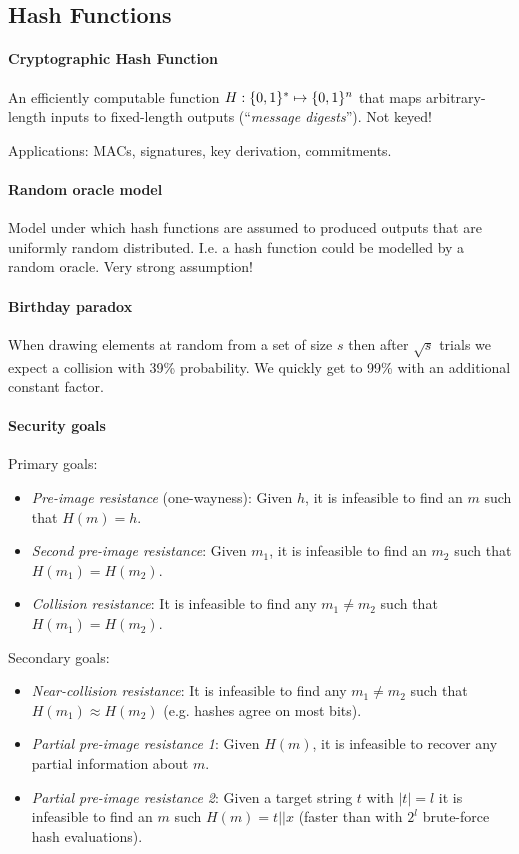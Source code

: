 \subsection{Hash Functions}

\paragraph{Cryptographic Hash Function}
An efficiently computable function $H: \lbrace 0, 1 \rbrace^* \mapsto \lbrace 0, 1 \rbrace^n$ that maps arbitrary-length inputs to fixed-length outputs (``\emph{message digests}'').
Not keyed!

Applications: MACs, signatures, key derivation, commitments.

\paragraph{Random oracle model}
Model under which hash functions are assumed to produced outputs that are uniformly random distributed.
I.e. a hash function could be modelled by a random oracle.
Very strong assumption!

\paragraph{Birthday paradox}
When drawing elements at random from a set of size $s$ then after $\sqrt{s}$ trials we expect a collision with 39\% probability.
We quickly get to 99\% with an additional constant factor.

\paragraph{Security goals}
Primary goals:
\begin{itemize}
	\item \emph{Pre-image resistance} (one-wayness):
	Given $h$, it is infeasible to find an $m$ such that $H(m) = h$.
	\item \emph{Second pre-image resistance}:
	Given $m_1$, it is infeasible to find an $m_2$ such that $H(m_1) = H(m_2)$.
	\item \emph{Collision resistance}:
	It is infeasible to find any $m_1 \neq m_2$ such that $H(m_1) = H(m_2)$.
\end{itemize}

Secondary goals:
\begin{itemize}
	\item \emph{Near-collision resistance}:
	It is infeasible to find any $m_1 \neq m_2$ such that $H(m_1) \approx H(m_2)$ (e.g. hashes agree on most bits).
	\item \emph{Partial pre-image resistance 1}:
	Given $H(m)$, it is infeasible to recover any partial information about $m$.
	\item \emph{Partial pre-image resistance 2}:
	Given a target string $t$ with $|t|=l$ it is infeasible to find an $m$ such $H(m)=t||x$ (faster than with $2^l$ brute-force hash evaluations).
\end{itemize}

